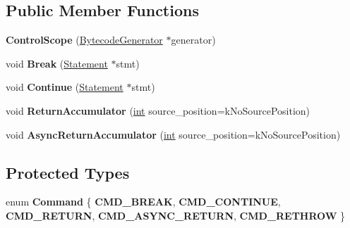 \subsection*{Public Member Functions}
\begin{DoxyCompactItemize}
\item 
\mbox{\label{classv8_1_1internal_1_1interpreter_1_1BytecodeGenerator_1_1ControlScope_a6fde8346423739e90e07a09cc0507c50}} 
{\bfseries Control\+Scope} (\mbox{\hyperlink{classv8_1_1internal_1_1interpreter_1_1BytecodeGenerator}{Bytecode\+Generator}} $\ast$generator)
\item 
\mbox{\label{classv8_1_1internal_1_1interpreter_1_1BytecodeGenerator_1_1ControlScope_a9e4750e9e467e0dac979a58e5a54f38a}} 
void {\bfseries Break} (\mbox{\hyperlink{classv8_1_1internal_1_1Statement}{Statement}} $\ast$stmt)
\item 
\mbox{\label{classv8_1_1internal_1_1interpreter_1_1BytecodeGenerator_1_1ControlScope_a6cb96ab2060a74b9338e86405e33e375}} 
void {\bfseries Continue} (\mbox{\hyperlink{classv8_1_1internal_1_1Statement}{Statement}} $\ast$stmt)
\item 
\mbox{\label{classv8_1_1internal_1_1interpreter_1_1BytecodeGenerator_1_1ControlScope_a77183289ad9c9821249548c0a3c558b1}} 
void {\bfseries Return\+Accumulator} (\mbox{\hyperlink{classint}{int}} source\+\_\+position=k\+No\+Source\+Position)
\item 
\mbox{\label{classv8_1_1internal_1_1interpreter_1_1BytecodeGenerator_1_1ControlScope_aca122b43c2d33547bdc26eb9fcfa53cc}} 
void {\bfseries Async\+Return\+Accumulator} (\mbox{\hyperlink{classint}{int}} source\+\_\+position=k\+No\+Source\+Position)
\end{DoxyCompactItemize}
\subsection*{Protected Types}
\begin{DoxyCompactItemize}
\item 
\mbox{\label{classv8_1_1internal_1_1interpreter_1_1BytecodeGenerator_1_1ControlScope_ad432302094607f68b8201756743bcd5f}} 
enum {\bfseries Command} \{ \newline
{\bfseries C\+M\+D\+\_\+\+B\+R\+E\+AK}, 
{\bfseries C\+M\+D\+\_\+\+C\+O\+N\+T\+I\+N\+UE}, 
{\bfseries C\+M\+D\+\_\+\+R\+E\+T\+U\+RN}, 
{\bfseries C\+M\+D\+\_\+\+A\+S\+Y\+N\+C\+\_\+\+R\+E\+T\+U\+RN}, 
\newline
{\bfseries C\+M\+D\+\_\+\+R\+E\+T\+H\+R\+OW}
 \}
\end{DoxyCompactItemize}

